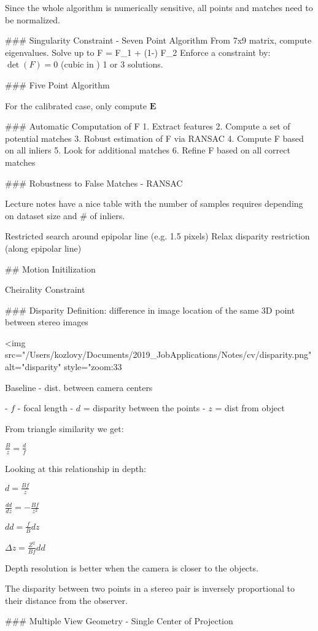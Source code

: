 Since the whole algorithm is numerically sensitive, all points and matches need to be normalized. 

### Singularity Constraint - Seven Point Algorithm
From 7x9 matrix, compute eigenvalues.
Solve up to F = \alpha F_1 + (1-\alpha) F_2 
Enforce a constraint by: $\det(F) = 0$ (cubic in \lambda)
1 or 3 solutions.

### Five Point Algorithm

For the calibrated case, only compute $\mathbf{E}$

### Automatic Computation of F
1. Extract features
2. Compute a set of potential matches
3. Robust estimation of F via RANSAC  
4. Compute F based on all inliers
5. Look for additional matches
6. Refine F based on all correct matches

### Robustness to False Matches - RANSAC

Lecture notes have a nice table with the number of samples requires depending on dataset size and # of inliers.

Restricted search around epipolar line (e.g. 1.5 pixels)
Relax disparity restriction (along epipolar line)

## Motion Initilization

Cheirality Constraint


### Disparity
Definition: difference in image location of the same 3D point between stereo images

<img src="/Users/kozlovy/Documents/2019_JobApplications/Notes/cv/disparity.png" alt="disparity" style="zoom:33%

Baseline - dist. between camera centers

- $f$ - focal length
- $d$ = disparity between the points
- $z$ = dist from object

From triangle similarity we get:

$\frac{B}{z} = \frac{d}{f}$

Looking at this relationship in depth:

${d}=\frac{Bf}{z} $

$\frac{dd}{dz}=-\frac{Bf}{z^2}$

$dd = \frac{f}{B}dz$

$\Delta z = \frac{Z^2}{Bf}dd$

Depth resolution is better when the camera is closer to the objects.

The disparity between two points in a stereo pair is inversely proportional to their distance from the observer.

### Multiple View Geometry - Single Center of Projection

